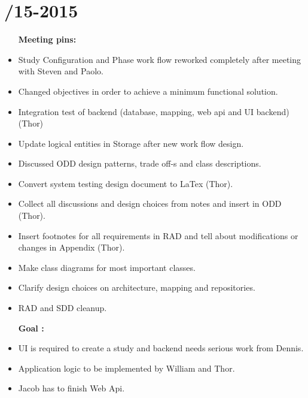 \section{/15-2015} %
\attend{\at}{\at}{\at}{\at}


\begin{itemize}
	\item [\textbf{Meeting pins:}]
	\item Study Configuration and Phase work flow reworked completely after meeting with Steven and Paolo.
	\item Changed objectives in order to achieve a minimum functional solution. 
	\item Integration test of backend (database, mapping, web api and UI backend) (Thor)
	\item Update logical entities in Storage after new work flow design. 
	\item Discussed ODD design patterns, trade off-s and class descriptions. 
	\item Convert system testing design document to LaTex (Thor).
	\item Collect all discussions and design choices from notes and insert in ODD (Thor).
	\item Insert footnotes for all requirements in RAD and tell about modifications or changes in Appendix (Thor). 
	\item Make class diagrams for most important classes.
	\item Clarify design choices on architecture, mapping and repositories. 
	\item RAD and SDD cleanup. 
\end{itemize}

\begin{itemize}
	\item[\textbf{Goal : }]
	\item UI is required to create a study and backend needs serious work from Dennis.
	\item Application logic to be implemented by William and Thor. 
	\item Jacob has to finish Web Api. 
\end{itemize}